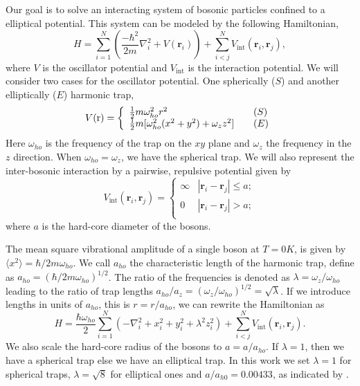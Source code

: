 \documentclass[aps,reprint,superscriptaddress,nofootinbib]{revtex4-2}
\begin{document}
    Our goal is to solve an interacting system of bosonic particles confined to a elliptical potential. This system can be modeled by the following Hamiltonian,
    \begin{equation*}
        H = \sum_{i=1}^N \left( \frac{- \hbar^2}{2m} \nabla_i^2 + V(\bm r_i) \right) + \sum_{i < j}^N V_{\text{int}}(\bm r_i, \bm r_j),
    \end{equation*}
    where \(V\) is the oscillator potential and \(V_{\text{int}}\) is the interaction potential. We will consider two cases for the oscillator potential. One spherically (\(S\)) and another elliptically (\(E\)) harmonic trap,
    \begin{equation*}
        V(\rm r) = 
        \left\{
        \begin{array}{ll}
            \frac{1}{2} m \omega_{ho}^2 r^2 \quad  &(S)   \\
            \frac{1}{2} m [\omega_{ho}^2 (x^2 + y^2) + \omega_z z^2] \quad &(E)  \\
        \end{array} 
        \right.
    \end{equation*}
    Here \(\omega_{ho}\) is the frequency of the trap on the \(xy\) plane and \(\omega_z\) the frequency in the \(z\) direction. When \(\omega_{ho} = \omega_z\), we have the spherical trap. We will also represent the inter-bosonic interaction by a pairwise, repulsive potential given by
    \begin{equation*}
        V_{\text{int}}(\bm r_i, \bm r_j) = 
        \left\{
        \begin{array}{ll}
            \infty & |\bm r_i - \bm r_j| \leq a; \\
            0  & |\bm r_i - \bm r_j| > a; \\
        \end{array} 
        \right.
    \end{equation*}
    where \(a\) is the hard-core diameter of the bosons. 
    
    The mean square vibrational amplitude of a single boson at \(T = 0K\), is given by \(\langle x^2 \rangle = \hbar/2m\omega_{ho}\). We call \(a_{ho}\) the characteristic length of the harmonic trap, define as \(a_{ho} = (\hbar/2m\omega_{ho})^{1/2}\). The ratio of the frequencies is denoted as \(\lambda = \omega_{z} / \omega_{ho}\) leading to the ratio of trap lengths \(a_{ho} / a_{z} = (\omega_{z} / \omega_{ho})^{1/2} = \sqrt{\lambda}\). If we introduce lengths in units of \(a_{ho}\), this is \(r = r / a_{ho}\), we can rewrite the Hamiltonian as 
    \begin{equation*}
        H = \frac{\hbar \omega_{ho}}{2} \sum_{i=1}^N \left( - \nabla_i^2 + x_i^2 + y_i^2 + \lambda^2 z_i^2  \right) + \sum_{i < j}^N V_{\text{int}}(\bm r_i, \bm r_j).
    \end{equation*}
    We also scale the hard-core radius of the bosons to \(a = a / a_{ho}\). If \(\lambda = 1\), then we have a spherical trap else we have an elliptical trap. In this work we set \(\lambda = 1\) for spherical traps, \(\lambda = \sqrt{8}\) for elliptical ones and \(a / a_{h0} = 0.00433\), as indicated by \cite{bec-trapped-bosons, vortex-bec}.
    
\end{document}
